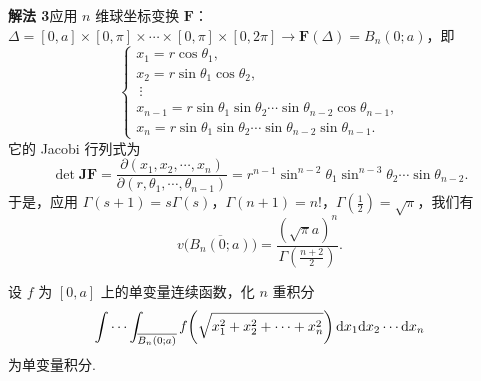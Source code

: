 \begin{example}[$n$ 维球的体积]
\noindent\textbf{解法 3}\quad 应用 $n$ 维球坐标变换 $\boldsymbol{F}$：
$\Delta = [0, a] \times [0, \pi] \times \cdots \times [0, \pi] \times [0, 2\pi]
\to \boldsymbol{F}(\Delta) = B_n(0; a)$，即
\[
\begin{cases}
x_1 = r\cos\theta_1,\\
x_2 = r\sin\theta_1 \cos\theta_2,\\
\ \vdots\\
x_{n-1} = r\sin\theta_1 \sin\theta_2 \cdots \sin\theta_{n-2} \cos\theta_{n-1},\\
x_n = r\sin\theta_1 \sin\theta_2 \cdots \sin\theta_{n-2} \sin\theta_{n-1}.
\end{cases}
\]
它的 Jacobi 行列式为
\[
\det \boldsymbol{J}\boldsymbol{F}
= \frac{\partial(x_1, x_2, \cdots, x_n)}{\partial(r, \theta_1, \cdots, \theta_{n-1})}
= r^{n-1} \sin^{n-2}\theta_1 \sin^{n-3}\theta_2 \cdots \sin\theta_{n-2}.
\]
于是，应用 $\Gamma(s + 1) = s\Gamma(s)$，$\Gamma(n + 1) = n!$，$\Gamma\left( \frac{1}{2} \right) = \sqrt{\pi}$，我们有
\[
v\bigl(\overline{B_n(0; a)}\bigr) = \frac{(\sqrt{\pi} a)^n}{\Gamma\left( \frac{n + 2}{2} \right)}.
\]
\end{example}
\begin{example}\label{ex:10.5.13}
设 $f$ 为 $[0, a]$ 上的单变量连续函数，化 $n$ 重积分
\[
\idotsint _{\overline{B_n(0; a)}}
  f\!\left( \sqrt{x_1^2 + x_2^2 + \cdots + x_n^2} \right)
  \mathrm{d}x_1 \mathrm{d}x_2 \cdots \mathrm{d}x_n
\]
为单变量积分.
\end{example}


